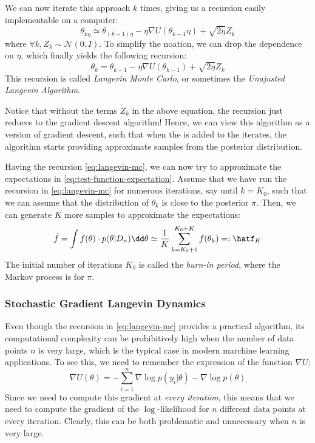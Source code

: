\documentclass[toc, titlepaged]{../cs-classes/cs-classes}
\begin{document}
We can now iterate this approach $k$ times, giving us a recursion easily implementable on a computer:
\begin{equation}
    \theta_{k\eta} \simeq \theta_{(k-1)\eta}-\eta\nabla U(\theta_{k-1}\eta)+\sqrt{2\eta}Z_k
\end{equation}
where $\forall k, Z_k\sim\mathcal{N}(0, I)$.
To simplify the noation, we can drop the dependence on $\eta$, which finally yields the following recursion:
\begin{equation}
    \label{eq:langevin-mc}
    \theta_k=\theta_{k-1}-\eta\nabla U(\theta_{k-1})+\sqrt{2\eta}Z_k
\end{equation}
This recursion is called \emph{Langevin Monte Carlo}, or sometimes the \emph{Unajusted Langevin Algorithm}.

Notice that without the terms $Z_k$ in the above equation, the recursion just reduces to the gradient descent algorithm! Hence, we can view this algorithm as a  version of gradient descent, such that when the  is added to the iterates, the algorithm starts providing
approximate samples from the posterior distribution.

Having the recursion \eqref{eq:langevin-mc}, we can now try to approximate the expectations in \eqref{eq:test-function-expectation}. Assume that we have run the recursion in \eqref{eq:langevin-mc} for numerous iterations, say until $k = K_0$, such that we can assume that the distribution of $\theta_k$ is close to the posterior $\pi$. Then, we can generate $K$ more samples to approximate the expectations:
\begin{equation}
    \bar{f} = \int f(\theta)\cdot p(\theta|D_n)\dd\theta \simeq \frac{1}{K}\sum_{k=K_0+1}^{K_0+K}f(\theta_k)=:\hatf_K
\end{equation}
The initial number of iterations $K_0$ is called the \emph{burn-in period}, where the Markov process is  for $\pi$.

\subsubsection{Stochastic Gradient Langevin Dynamics}
Even though the recursion in \eqref{eq:langevin-mc} provides a practical algorithm, its computational complexity can be prohibitively high when the number of data points $n$ is very large, which is the typical case in modern marchine learning applications. To see this, we need to remember the expression of the function $\nabla U$:
\begin{equation*}
    \nabla U(\theta)=-\sum_{i=1}^n\nabla\log p(y_i|\theta)-\nabla\log p(\theta)
\end{equation*}
Since we need to compute this gradient at \emph{every iteration}, this means that we need to compute the gradient of the $\log$-likelihood for $n$ different data points at every iteration. Clearly, this can be both problematic and unnecessary when $n$ is very large.
\end{document}
